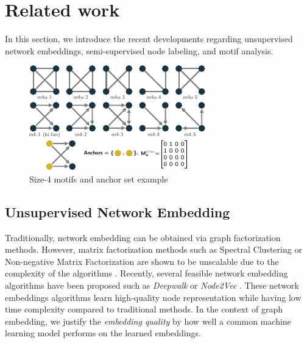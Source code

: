 \documentclass{article}
\theoremstyle{definition}
\begin{document}
\section{Related work}

In this section, we introduce the recent developments regarding unsupervised 
network embeddings, semi-supervised node labeling, and motif analysis.

\begin{figure} 
    \centering
    \includegraphics[width=0.9\linewidth]{m4}
    \caption{Size-4 motifs and anchor set example}
    \label{fig:m4}
\end{figure}

\subsection{Unsupervised Network Embedding}

Traditionally, network embedding can be obtained via graph 
factorization methods. However, matrix factorization methods such as
Spectral Clustering or Non-negative Matrix Factorization are 
shown to be unscalable due to the complexity of the algorithms 
\cite{deepwalk,eigmaps,pca}. Recently, several feasible network
embedding algorithms have been proposed such as \emph{Deepwalk}
\cite{deepwalk} or \emph{Node2Vec} \cite{node2vec}. These network embeddings 
algorithms learn high-quality node representation while having low time
complexity compared to traditional methods. In the context of graph embedding, we 
justify the \emph{embedding quality} by how well a common machine learning model 
performs on the learned embeddings. 
\end{document}

